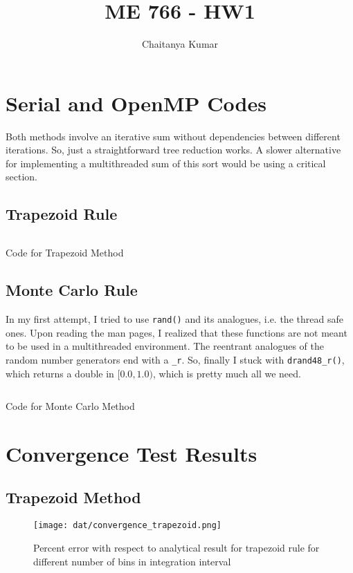 \documentclass[a4paper]{article}
\title{ME 766 - HW1}
\author{Chaitanya Kumar}
\date{}
\newenvironment{code}{\captionsetup{type=listing}}{}
\begin{document}
    \maketitle
    \section{Serial and OpenMP Codes} 

    Both methods involve an iterative sum without
    dependencies between different iterations. So,
    just a straightforward tree reduction works.
    A slower alternative for implementing a
    multithreaded sum of this sort would be using
    a critical section.
    \subsection*{Trapezoid Rule}

    \begin{code}
    \inputminted[samepage=false, breaklines, firstline=20, lastline=30]{c}{src/integrate.c}
    \label{lst:trapezoid_code}
    \caption{Code for Trapezoid Method}
    \end{code}

    \subsection*{Monte Carlo Rule}
    In my first attempt, I tried to use \texttt{rand()} and its analogues, i.e. the thread safe ones.
    Upon reading the man pages, I realized that
    these functions are not meant to be used in
    a multithreaded environment. The reentrant
    analogues of the random number generators
    end with a \texttt{\_r}. So, finally I stuck with
    \texttt{drand48\_r()}, which returns a double
    in $[0.0,1.0)$, which is pretty much all we need.

    \begin{code}
    \inputminted[samepage=false, breaklines, firstline=33, lastline=51]{c}{src/integrate.c}
    \label{lst:montecarlo_code}
    \caption{Code for Monte Carlo Method}
    \end{code}  


\section{Convergence Test Results}
    \subsection*{Trapezoid Method}
    \begin{figure}[!h]
        \centering
        \texttt{[image: dat/convergence\_trapezoid.png]}
        \caption{Percent error with respect to analytical result for trapezoid rule for different number of bins in integration interval}
        \label{fig:dat-trapezoid_convergence-png}
    \end{figure}
    \pagebreak
\end{document}

